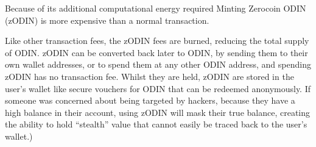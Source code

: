 \documentclass[12pt,letterpaper]{article}
\begin{document}
Because of its additional computational energy required Minting Zerocoin ODIN (zODIN) is more expensive than a normal transaction.

Like other transaction fees, the zODIN fees are burned, reducing the total supply of ODIN. zODIN can be converted back later to ODIN, by sending them to their own wallet addresses, or to spend them at any other ODIN address, and spending zODIN has no transaction fee. Whilst they are held, zODIN are stored in the user's wallet like secure vouchers for ODIN that can be redeemed anonymously. If someone was concerned about being targeted by hackers, because they have a high balance in their account, using zODIN will mask their true balance, creating the ability to hold ``stealth'' value that cannot easily be traced back to the user's wallet.)

\end{document}
